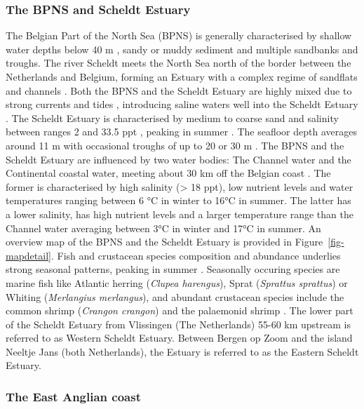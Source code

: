 \documentclass[
  authoryear,
  review,
  3p]{elsarticle}
\begin{document}
\hypertarget{sec-mmscheldtBPNS}{%
\subsubsection{The BPNS and Scheldt Estuary}\label{sec-mmscheldtBPNS}}

The Belgian Part of the North Sea (BPNS) is generally characterised by
shallow water depths below 40 m \citep{thierry_2019}, sandy or muddy
sediment \citep{wolff_1973, vasquez_2021} and multiple sandbanks and
troughs. The river Scheldt meets the North Sea north of the border
between the Netherlands and Belgium, forming an Estuary with a complex
regime of sandflats and channels \citep{claessens_1988}. Both the BPNS
and the Scheldt Estuary are highly mixed due to strong currents and
tides \citep{otto_1990}, introducing saline waters well into the Scheldt
Estuary \citep{ouboter_1998}. The Scheldt Estuary is characterised by
medium to coarse sand and salinity between ranges 2 and 33.5 ppt
\citep{baeyens_1998}, peaking in summer \citep{maes_1998}. The seafloor
depth averages around 11 m with occasional troughs of up to 20 or 30 m
\citep{thierry_2019}. The BPNS and the Scheldt Estuary are influenced by
two water bodies: The Channel water and the Continental coastal water,
meeting about 30 km off the Belgian coast \citep{wolff_1973}. The former
is characterised by high salinity (\textgreater{} 18 ppt), low nutrient
levels and water temperatures ranging between 6 °C in winter to 16°C in
summer. The latter has a lower salinity, has high nutrient levels and a
larger temperature range than the Channel water averaging between 3°C in
winter and 17°C in summer. An overview map of the BPNS and the Scheldt
Estuary is provided in Figure~\ref{fig-mapdetail}. Fish and crustacean
species composition and abundance underlies strong seasonal patterns,
peaking in summer \citep{maes_1998, maes_2005}. Seasonally occuring
species are marine fish like Atlantic herring (\emph{Clupea harengus}),
Sprat (\emph{Sprattus sprattus}) or Whiting (\emph{Merlangius
merlangus}), and abundant crustacean species include the common shrimp
(\emph{Crangon crangon}) and the palaemonid shrimp \citep[\emph{Palaemon
varians},][]{maes_1998}. The lower part of the Scheldt Estuary from
Vlissingen (The Netherlands) 55-60 km upstream is referred to as Western
Scheldt Estuary\citep{baeyens_1998, ouboter_1998}. Between Bergen op
Zoom and the island Neeltje Jans (both Netherlands), the Estuary is
referred to as the Eastern Scheldt Estuary.

\hypertarget{the-east-anglian-coast}{%
\subsubsection{The East Anglian coast}\label{the-east-anglian-coast}}
\end{document}
